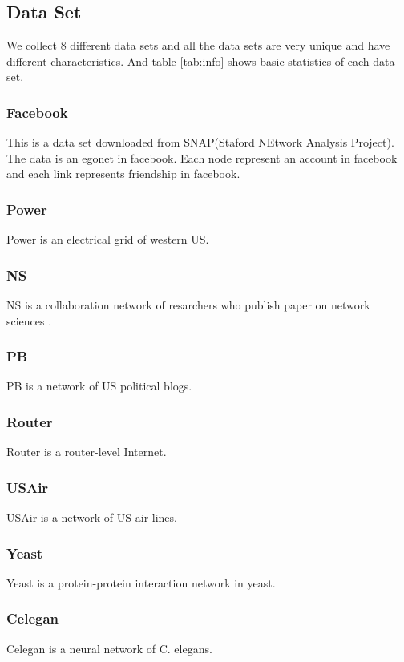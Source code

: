 \documentclass[12pt]{article}
\begin{document}
\subsection {Data Set}
We collect 8 different data sets and all the data sets are very unique and have different characteristics. And table \ref{tab:info} shows basic statistics of each data set.
\subsubsection{Facebook}
This is a data set downloaded from SNAP(Staford NEtwork Analysis Project)\cite{snapnets}. The data is an egonet in facebook. Each node represent an account in facebook and each link represents friendship in facebook.
\subsubsection{Power}
Power is  an electrical grid of western US\cite{small_world}.
\subsubsection{NS}
NS is a collaboration network of resarchers who publish paper on network sciences \cite{Newman_2006}.
\subsubsection{PB}
PB is a network of US political blogs.\cite{pb}
\subsubsection{Router}
Router is a router-level Internet.\cite{router}
\subsubsection{USAir}
USAir is a network of US air lines. \cite{usair}
\subsubsection{Yeast}
Yeast is a protein-protein interaction network in yeast.\cite{yeast}

\subsubsection{Celegan}
Celegan is a neural network of C. elegans.\cite{small_world}
\end{document}
